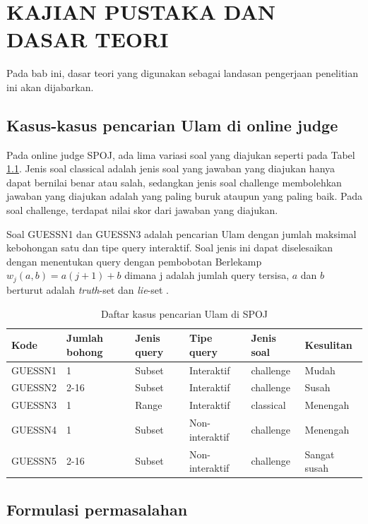 \chapter {KAJIAN PUSTAKA DAN DASAR TEORI}

Pada bab ini, dasar teori yang digunakan sebagai landasan pengerjaan penelitian ini akan dijabarkan.

\section{Kasus-kasus pencarian Ulam di online judge}

Pada online judge SPOJ, ada lima variasi soal yang diajukan seperti pada Tabel \ref{tab:kasus_spoj}. Jenis soal classical adalah jenis soal yang jawaban yang diajukan hanya dapat bernilai benar atau salah, sedangkan jenis soal challenge membolehkan jawaban yang diajukan adalah yang paling buruk ataupun yang paling baik. Pada soal challenge, terdapat nilai skor dari jawaban yang diajukan.

Soal GUESSN1 dan GUESSN3 adalah pencarian Ulam dengan jumlah maksimal kebohongan satu dan tipe query interaktif. Soal jenis ini dapat diselesaikan dengan menentukan query dengan pembobotan Berlekamp $w_j (a,b)=a(j+1)+b$ dimana j adalah jumlah query tersisa, $a$ dan $b$ berturut adalah \textit{truth}-set dan \textit{lie}-set \cite{Pelc1987}.

\begin{table}[h!]
\caption{Daftar kasus pencarian Ulam di SPOJ}
\label{tab:kasus_spoj}
\begin{center}
\begin{tabular} {|l|l|l|l|l|l|}
\hline
Kode & Jumlah bohong & Jenis query & Tipe query & Jenis soal & Kesulitan \\
\hline
GUESSN1 & 1 & Subset & Interaktif & challenge & Mudah \\
\hline
GUESSN2 & 2-16 & Subset & Interaktif & challenge & Susah  \\
\hline
GUESSN3 & 1 & Range & Interaktif & classical & Menengah \\
\hline
GUESSN4 & 1 & Subset & Non-interaktif & challenge & Menengah \\
\hline
GUESSN5 & 2-16 & Subset & Non-interaktif & challenge & Sangat susah \\
\hline
\end{tabular}
\end{center}
\end{table}


\section{Formulasi permasalahan}

